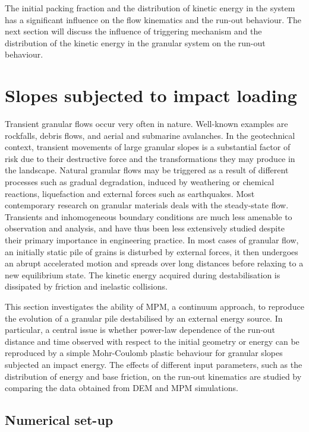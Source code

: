 The initial packing fraction and the distribution of kinetic energy in the 
system has a significant influence on the flow kinematics and the run-out 
behaviour. The next section will discuss the influence of triggering mechanism 
and the distribution of the kinetic energy in the granular system on the 
run-out behaviour.  



\section{Slopes subjected to impact loading}
\label{sec:slope}
Transient granular flows occur very often in nature. Well-known examples are 
rockfalls, debris flows, and aerial and submarine avalanches. In the 
geotechnical context, transient movements of large granular slopes 
is a substantial factor of risk due to their destructive force and the 
transformations they may produce in the landscape. Natural granular flows 
may be triggered as a result of different processes such as gradual 
degradation, induced by weathering or chemical reactions, liquefaction and 
external forces such as earthquakes. Most contemporary research on granular 
materials deals with the steady-state flow. Transients and inhomogeneous 
boundary conditions are much less amenable to observation and analysis, and 
have thus been less extensively studied despite their primary importance in 
engineering practice. In most cases of granular flow, an initially static pile 
of grains is disturbed by external forces, it then undergoes an abrupt 
accelerated motion and spreads over long distances before relaxing to a new 
equilibrium state. The kinetic energy acquired during destabilisation is 
dissipated by friction and inelastic collisions.

This section investigates the ability of MPM, a continuum approach, to 
reproduce the evolution of a granular pile destabilised by an external energy 
source. In particular, a central issue is whether power-law dependence of the 
run-out distance and time observed with respect to the initial geometry or 
energy can be reproduced by a simple Mohr-Coulomb plastic behaviour for 
granular slopes subjected an impact energy. The effects of different input 
parameters, such as the distribution of energy and base friction, on the 
run-out kinematics are studied by comparing the data obtained from DEM and MPM 
simulations.

\subsection{Numerical set-up}
\label{sec:num}

